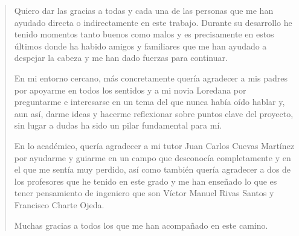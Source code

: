 \renewcommand{\abstractname}{Agradecimientos}
\begin{abstract}

Quiero dar las gracias a todas y cada una de las personas que me han ayudado directa o indirectamente en este trabajo. Durante su desarrollo he tenido momentos tanto buenos como malos y es precisamente en estos últimos donde ha habido amigos y familiares que me han ayudado a despejar la cabeza y me han dado fuerzas para continuar.

En mi entorno cercano, más concretamente quería agradecer a mis padres por apoyarme en todos los sentidos y a mi novia Loredana por preguntarme e interesarse en un tema del que nunca había oído hablar y, aun así, darme ideas y hacerme reflexionar sobre puntos clave del proyecto, sin lugar a dudas ha sido un pilar fundamental para mí.

En lo académico, quería agradecer a mi tutor Juan Carlos Cuevas Martínez por ayudarme y guiarme en un campo que desconocía completamente y en el que me sentía muy perdido, así como también quería agradecer a dos de los profesores que he tenido en este grado y me han enseñado lo que es tener pensamiento de ingeniero que son Víctor Manuel Rivas Santos y Francisco Charte Ojeda.

Muchas gracias a todos los que me han acompañado en este camino.


\end{abstract}

